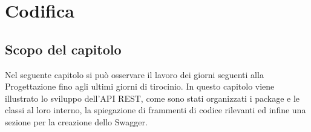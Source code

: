 \chapter{Codifica}
\label{cap:codifica}

\section{Scopo del capitolo}
Nel seguente capitolo si può osservare il lavoro dei giorni seguenti alla Progettazione fino agli ultimi giorni di tirocinio. In questo capitolo viene illustrato lo sviluppo dell'API REST, come sono stati organizzati i package e le classi al loro interno, la spiegazione di frammenti di codice rilevanti ed infine una sezione per la creazione dello Swagger. \\












